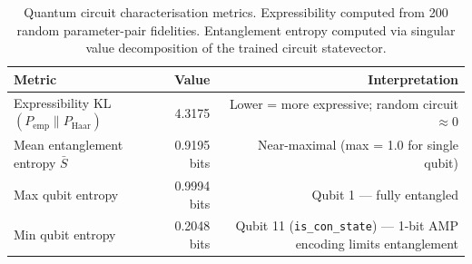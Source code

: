 \begin{table}[htbp]
\centering
\caption{Quantum circuit characterisation metrics. Expressibility computed from 200 random parameter-pair fidelities. Entanglement entropy computed via singular value decomposition of the trained circuit statevector.}
\label{tab:quantum_metrics}
\begin{tabular}{lrr}
\toprule
\textbf{Metric} & \textbf{Value} & \textbf{Interpretation} \\
\midrule
Expressibility KL$(P_{\text{emp}} \| P_{\text{Haar}})$ & 4.3175 & Lower = more expressive; random circuit $\approx 0$ \\
Mean entanglement entropy $\bar{S}$ & 0.9195 bits & Near-maximal (max = 1.0 for single qubit) \\
Max qubit entropy & 0.9994 bits & Qubit 1 — fully entangled \\
Min qubit entropy & 0.2048 bits & Qubit 11 (\texttt{is\_con\_state}) — 1-bit AMP encoding limits entanglement \\
\bottomrule
\end{tabular}
\end{table}